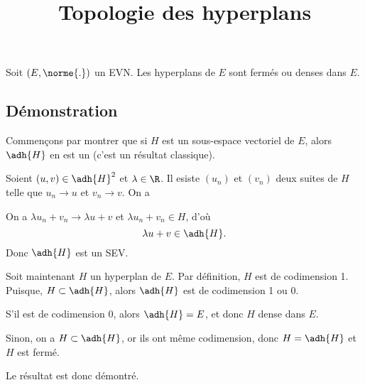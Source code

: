 \documentclass[fontsize=12pt,twoside=false,parskip=half, french]{scrartcl}
\title{Topologie des hyperplans}
\date{}
\author{}
\begin{document}
\maketitle
   \begin{Theoreme}
      Soit $(E, \norme{.})$ un EVN. Les hyperplans de $E$ sont fermés ou denses dans $E$.
   \end{Theoreme}
   \subsection{Démonstration}
      Commençons par montrer que si $H$ est un sous-espace vectoriel de $E$, alors
      $\adh{H}$ en est un (c’est un résultat classique).
      
      Soient $(u, v) \in \adh{H}^2$ et $\lambda \in \R$. Il esiste $(u_n)$ et $(v_n)$
      deux suites de $H$ telle que $u_n \to u$ et $v_n \to v$. On a 
      
      On a $\lambda u_n + v_n \to \lambda u + v$ et $\lambda u_n + v_n \in H$, d’où
      \[
         \lambda u + v \in \adh{H}.
      \]
      Donc $\adh{H}$ est un SEV.
      
      Soit maintenant $H$ un hyperplan de $E$. Par définition, $H$ est de codimension 1.
      Puisque, $H \subset \adh{H}$, alors $\adh{H}$ est de codimension 1 ou 0.
      \begin{description}
         \item S’il est de codimension 0, alors $\adh{H} = E$, et donc 
               $H$ dense dans $E$.
         \item Sinon, on a $H \subset \adh{H}$, or ils ont même codimension, donc $H = \adh{H}$ et $H$ est fermé.
      \end{description}
      Le résultat est donc démontré. 
\end{document}
